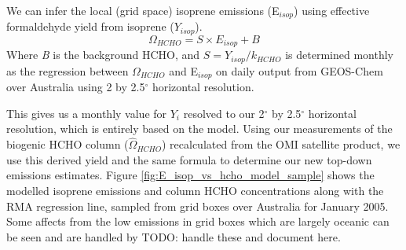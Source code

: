 \documentclass[acp, manuscript]{copernicus} %
\begin{document}
    We can infer the local (grid space) isoprene emissions (E$_{isop}$) using effective formaldehyde yield from isoprene ($Y_{isop}$).
    \begin{equation} \label{eqn:isop_yield}
      \Omega_{HCHO} = S \times E_{isop} + B
    \end{equation}
    Where \textit{B} is the background HCHO, and $S = Y_{isop}/k_{HCHO}$ is determined monthly as the regression between $\Omega_{HCHO}$ and E$_{isop}$ on daily output from GEOS-Chem over Australia using 2 by 2.5$^{\circ}$ horizontal resolution.
    
    This gives us a monthly value for $Y_i$ resolved to our 2$^{\circ}$ by 2.5$^{\circ}$ horizontal resolution, which is entirely based on the model.
    Using our measurements of the biogenic HCHO column ($\hat{\Omega}_{HCHO}$) recalculated from the OMI satellite product, we use this derived yield and the same formula to determine our new top-down emissions estimates.
    Figure \ref{fig:E_isop_vs_hcho_model_sample} shows the modelled isoprene emissions and column HCHO concentrations along with the RMA regression line, sampled from grid boxes over Australia for January 2005.
    Some affects from the low emissions in grid boxes which are largely oceanic can be seen and are handled by TODO: handle these and document here.
    
\end{document}

